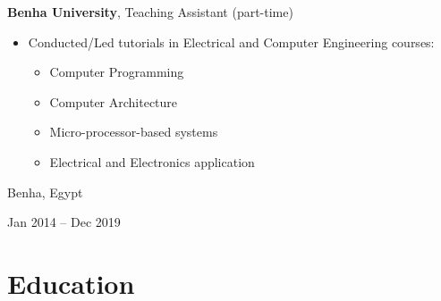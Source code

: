 \documentclass[10pt, letterpaper]{article}
\newenvironment{highlights}{
    \begin{itemize}[
        topsep=0.10 cm,
        parsep=0.10 cm,
        partopsep=0pt,
        itemsep=0pt,
        leftmargin=0.4 cm + 10pt
    ]
}{
    \end{itemize}
} %
\newenvironment{twocolentry}[2][]{
    \onecolentry
    \def\secondColumn{#2}
    \setcolumnwidth{\fill, 4.5 cm}
    \begin{paracol}{2}
}{
    \switchcolumn \raggedleft \secondColumn
    \end{paracol}
    \endonecolentry
} %
\begin{document}
     \vspace{0.2 cm}
 \begin{twocolentry}{
            Benha, Egypt

        Jan 2014 – Dec 2019
        }
            \textbf{Benha University}, Teaching Assistant (part-time)            \begin{highlights}
            \item Conducted/Led tutorials in Electrical and Computer Engineering courses:
            \vspace{-0.5 cm}
            \begin{multicols}{2}
            \setlength{\itemsep}{20pt}
            \begin{itemize}[leftmargin=*]
                \item Computer Programming 
                \item Computer Architecture
            \end{itemize}
            
            \columnbreak
            
            \begin{itemize}[leftmargin=*]
                \item Micro-processor-based systems
                \item  Electrical and Electronics application

            \end{itemize}
            
            \columnbreak
            
           
            \end{multicols}
            \end{highlights}
        \end{twocolentry}
    \vspace{-0.5 cm} 

    
    \section{Education}
\end{document}
